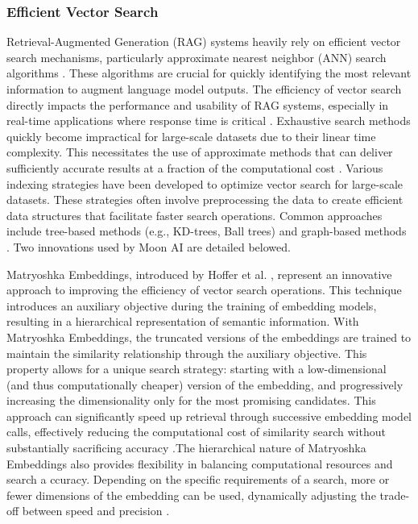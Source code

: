 \documentclass[a4paper, oneside]{discothesis}
\begin{document}
\subsubsection{Efficient Vector Search}
Retrieval-Augmented Generation (RAG) systems heavily rely on efficient vector search mechanisms, particularly approximate nearest neighbor (ANN) search algorithms \cite{johnson2019billion}. These algorithms are crucial for quickly identifying the most relevant information to augment language model outputs. The efficiency of vector search directly impacts the performance and usability of RAG systems, especially in real-time applications where response time is critical \cite{lewis2020retrieval}. Exhaustive search methods quickly become impractical for large-scale datasets due to their linear time complexity. This necessitates the use of approximate methods that can deliver sufficiently accurate results at a fraction of the computational cost \cite{andoni2018approximate}.
Various indexing strategies have been developed to optimize vector search for large-scale datasets. These strategies often involve preprocessing the data to create efficient data structures that facilitate faster search operations. Common approaches include tree-based methods (e.g., KD-trees, Ball trees) and graph-based methods \cite{malkov2018efficient}. Two innovations used by Moon AI are detailed belowed.

Matryoshka Embeddings, introduced by Hoffer et al. \cite{hoffer2018deep}, represent an innovative approach to improving the efficiency of vector search operations. This technique introduces an auxiliary objective during the training of embedding models, resulting in a hierarchical representation of semantic information. With Matryoshka Embeddings, the truncated versions of the embeddings are trained to maintain the similarity relationship through the auxiliary objective. This property allows for a unique search strategy: starting with a low-dimensional (and thus computationally cheaper) version of the embedding, and progressively increasing the dimensionality only for the most promising candidates. This approach can significantly speed up retrieval through successive embedding model calls, effectively reducing the computational cost of similarity search without substantially sacrificing accuracy \cite{hoffer2018deep}.The hierarchical nature of Matryoshka Embeddings also provides flexibility in balancing computational resources and search a ccuracy. Depending on the specific requirements of a search, more or fewer dimensions of the embedding can be used, dynamically adjusting the trade-off between speed and precision \cite{hoffer2018deep}.
\end{document}
